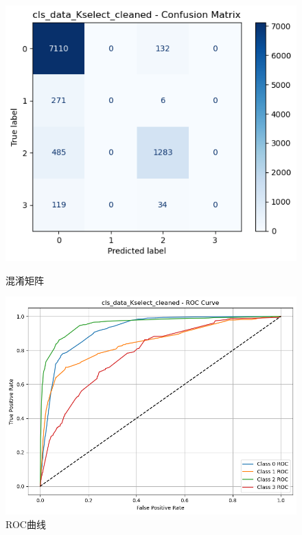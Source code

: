 \documentclass[10pt]{article}
\begin{document}
\begin{figure}[H]
\centering
\begin{minipage}[t]{0.45\textwidth}
  \centering
  \includegraphics[width=\linewidth]{cls_rf_10sc.png}
  \caption{混淆矩阵}
  \label{fig:69}
\end{minipage}
\hfill
\begin{minipage}[t]{0.52\textwidth}
  \centering
  \includegraphics[width=\linewidth]{cls_rf_10sc2.png}
  \caption{ROC曲线}
  \label{fig:70}
\end{minipage}
\end{figure}
\end{document}
